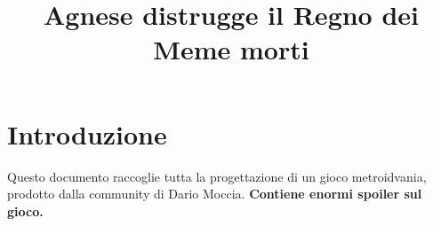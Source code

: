 \documentclass{article}
\title{Agnese distrugge il Regno dei Meme morti}
\date{}
\begin{document}
    \maketitle
    \newpage
    \tableofcontents
    
    \newpage
    \section*{Introduzione}
        Questo documento raccoglie tutta la progettazione di un gioco metroidvania, prodotto dalla community
        di Dario Moccia. \textbf{Contiene enormi spoiler sul gioco.}
        
    
    
    
    
    
    
    
    
        
    
    
    
        
    
\end{document}
